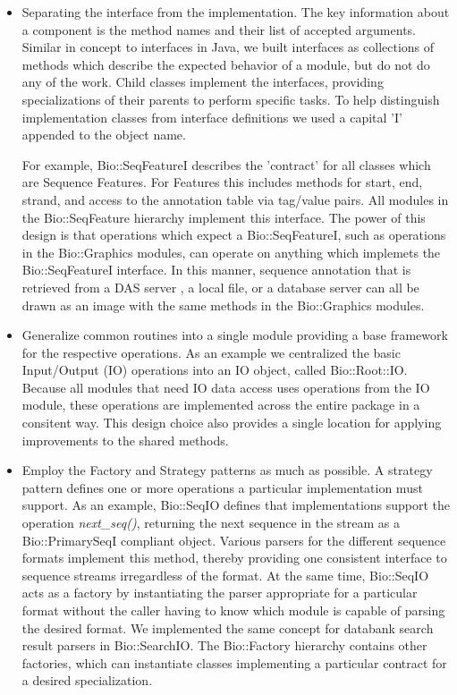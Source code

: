 \documentclass[12pt]{article}
\begin{document}
\begin{itemize}

\item Separating the interface from the implementation.  The key
information about a component is the method names and their list
of accepted arguments.  Similar in concept to interfaces in Java, we
built interfaces as collections of methods which describe the expected
behavior of a module, but do not do any of the work.  Child classes
implement the interfaces, providing specializations of their parents
to perform specific tasks.  To help distinguish implementation classes from
interface definitions we used a capital 'I' appended to the object
name.

For example, Bio::SeqFeatureI describes the 'contract' for all classes
which are Sequence Features.  For Features this includes methods for
start, end, strand, and access to the annotation table via tag/value pairs.  All
modules in the Bio::SeqFeature hierarchy implement this interface.
The power of this design is that operations which expect a
Bio::SeqFeatureI, such as operations in the Bio::Graphics modules, can
operate on anything which implemets the Bio::SeqFeatureI interface.
In this manner, sequence annotation that is retrieved from a DAS
server \cite{das}, a local file, or a database server can all be drawn as an
image with the same methods in the Bio::Graphics modules.

\item Generalize common routines into a single module providing a base
framework for the respective operations.  As an example we centralized
the basic Input/Output (IO) operations into an IO object, called
Bio::Root::IO.  Because all modules that need IO data access uses
operations from the IO module, these operations are implemented across
the entire package in a consitent way.  This design choice also
provides a single location for applying improvements to the shared
methods.

\item Employ the Factory and Strategy patterns \cite{gangoffour} as much as possible. A
strategy pattern defines one or more operations a particular
implementation must support. As an example, Bio::SeqIO defines that
implementations support the operation \textit{next\_seq()}, returning
the next sequence in the stream as a Bio::PrimarySeqI compliant
object. Various parsers for the different sequence formats implement
this method, thereby providing one consistent interface to sequence
streams irregardless of the format. At the same time, Bio::SeqIO acts
as a factory by instantiating the parser appropriate for a particular
format without the caller having to know which module is capable of
parsing the desired format. We implemented the same concept for
databank search result parsers in Bio::SearchIO. The Bio::Factory
hierarchy contains other factories, which can instantiate classes
implementing a particular contract for a desired specialization.

\end{itemize}
\end{document}
